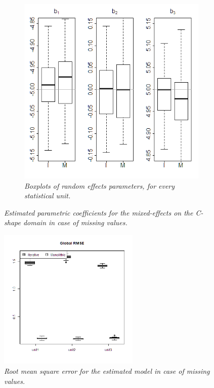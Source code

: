 \begin{figure}
\begin{subfigure}{0.45\textwidth}
		\includegraphics[width=\textwidth]{images/bna.png}
		\centering
		\caption{\textit{Boxplots of random effects parameters, for every statistical unit.}}
		\label{bna}
	\end{subfigure}
	\caption{\textit{Estimated parametric coefficients for the
			mixed-effects on the C-shape domain in case of missing values.} }
\end{figure}

\begin{figure}[t]
	\includegraphics[width=0.6\textwidth]{images/rmsena.png}
	\centering
	\caption{\textit{Root mean square error for the estimated model in case of missing values.}}
	\label{rmsena}
\end{figure}
%

